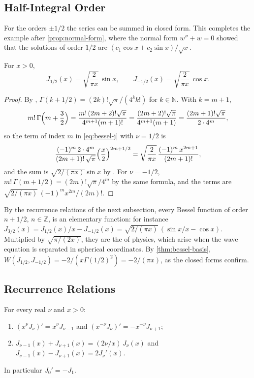 \subsection{Half-Integral Order}

For the orders $\pm1/2$ the series can be summed in closed form. This completes the example after \cref{prop:normal-form}, where the normal form $w''+w=0$ showed that the solutions of order $1/2$ are $(c_1\cos x+c_2\sin x)/\sqrt x$.

\begin{proposition}
\label{prop:bessel-half}
For $x>0$,
\[
J_{1/2}(x)=\sqrt{\frac2{\pi x}}\,\sin x,\qquad J_{-1/2}(x)=\sqrt{\frac2{\pi x}}\,\cos x .
\]
\end{proposition}

\begin{proof}
By , $\Gamma(k+1/2)=(2k)!\sqrt\pi/(4^kk!)$ for $k\in\mathbb N$. With $k=m+1$,
\[
m!\,\Gamma\Bigl(m+\frac32\Bigr)=\frac{m!\,(2m+2)!\sqrt\pi}{4^{m+1}(m+1)!}=\frac{(2m+2)!\sqrt\pi}{4^{m+1}(m+1)}=\frac{(2m+1)!\sqrt\pi}{2\cdot4^m},
\]
so the term of index $m$ in \eqref{eq:bessel-j} with $\nu=1/2$ is
\[
\frac{(-1)^m\,2\cdot4^m}{(2m+1)!\,\sqrt\pi}\Bigl(\frac x2\Bigr)^{2m+1/2}=\sqrt{\frac2{\pi x}}\,\frac{(-1)^m\,x^{2m+1}}{(2m+1)!},
\]
and the sum is $\sqrt{2/(\pi x)}\sin x$ by . For $\nu=-1/2$, $m!\,\Gamma(m+1/2)=(2m)!\sqrt\pi/4^m$ by the same formula, and the terms are $\sqrt{2/(\pi x)}\,(-1)^mx^{2m}/(2m)!$.
\end{proof}

By the recurrence relations of the next subsection, every Bessel function of order $n+1/2$, $n\in\mathbb Z$, is an elementary function: for instance $J_{3/2}(x)=J_{1/2}(x)/x-J_{-1/2}(x)=\sqrt{2/(\pi x)}\,(\sin x/x-\cos x)$. Multiplied by $\sqrt{\pi/(2x)}$, they are the  of physics, which arise when the wave equation is separated in spherical coordinates. By \cref{thm:bessel-basis}, $W(J_{1/2},J_{-1/2})=-2/(x\Gamma(1/2)^2)=-2/(\pi x)$, as the closed forms confirm.

\subsection{Recurrence Relations}

\begin{proposition}
\label{prop:bessel-recurrences}
For every real $\nu$ and $x>0$:
\begin{enumerate}
\item $(x^\nu J_\nu)'=x^\nu J_{\nu-1}$ and $(x^{-\nu}J_\nu)'=-x^{-\nu}J_{\nu+1}$;
\item $J_{\nu-1}(x)+J_{\nu+1}(x)=(2\nu/x)\,J_\nu(x)$ and $J_{\nu-1}(x)-J_{\nu+1}(x)=2J_\nu'(x)$.
\end{enumerate}
In particular $J_0'=-J_1$.
\end{proposition}

